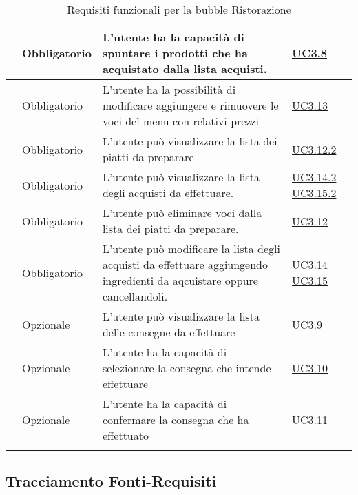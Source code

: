 \begin{longtable}{|P{1.5cm}|P{2.5cm}|P{6.5cm}|P{2.5cm}|}
	\hline \RequisitoObF\label{L28} & Obbligatorio & L'utente  ha la capacità di spuntare i prodotti che ha acquistato dalla lista acquisti.
	 & \hyperref[UC3.8]{UC3.8} \\
	\hline \RequisitoObF\label{L29} & Obbligatorio & L'utente  ha la possibilità di modificare aggiungere e rimuovere le voci del menu con relativi prezzi & \hyperref[UC3.13]{UC3.13} \\
	\hline \RequisitoObF\label{L30} & Obbligatorio & L'utente  può visualizzare la lista dei piatti da preparare & \hyperref[UC3.12.2]{UC3.12.2} \\
	\hline \RequisitoObF\label{L31} & Obbligatorio & L'utente  può visualizzare la lista degli acquisti da effettuare. & \hyperref[UC3.14.2]{UC3.14.2} \hyperref[UC3.15.2]{UC3.15.2} \\
	\hline \RequisitoObF\label{L32} & Obbligatorio & L'utente  può eliminare voci dalla lista dei piatti da preparare. & \hyperref[UC3.12]{UC3.12} \\
	\hline \RequisitoObF\label{L53} & Obbligatorio & L'utente  può modificare la lista degli acquisti da effettuare aggiungendo ingredienti da aqcuistare oppure cancellandoli.
	 & \hyperref[UC3.14]{UC3.14} \linebreak \hyperref[UC3.15]{UC3.15} \\	 
	\hline \RequisitoOpF\label{L50} & Opzionale & L'utente  può visualizzare la lista delle consegne da effettuare & \hyperref[UC3.9]{UC3.9} \\
	\hline \RequisitoOpF\label{L51} & Opzionale & L'utente  ha la capacità di selezionare la consegna che intende effettuare & \hyperref[UC3.10]{UC3.10} \\
	\hline \RequisitoOpF\label{L52} & Opzionale & L'utente  ha la capacità di confermare la consegna che ha effettuato & \hyperref[UC3.11]{UC3.11} \\
	\hline
	\caption{Requisiti funzionali per la bubble Ristorazione}
\end{longtable}

\subsection{Tracciamento Fonti-Requisiti}

